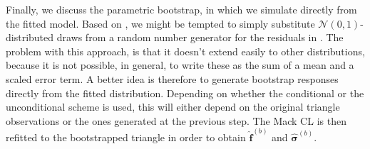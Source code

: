 \documentclass[a4paper]{book}
\begin{document}
Finally, we discuss the parametric bootstrap, in which we simulate directly from the fitted model. Based on , we might be tempted to simply substitute $\mathcal{N}(0, 1)$-distributed draws from a random number generator for the residuals in . The problem with this approach, is that it doesn't extend easily to other distributions, because it is not possible, in general, to write these as the sum of a mean and a scaled error term. A better idea is therefore to generate bootstrap responses directly from the fitted distribution. Depending on whether the conditional or the unconditional scheme is used, this will either depend on the original triangle observations or the ones generated at the previous step. The Mack CL is then refitted to the bootstrapped triangle in order to obtain $\widehat{\bm{f}}^{(b)}$ and $\widehat{\bm{\sigma}}^{(b)}$.
\end{document}
